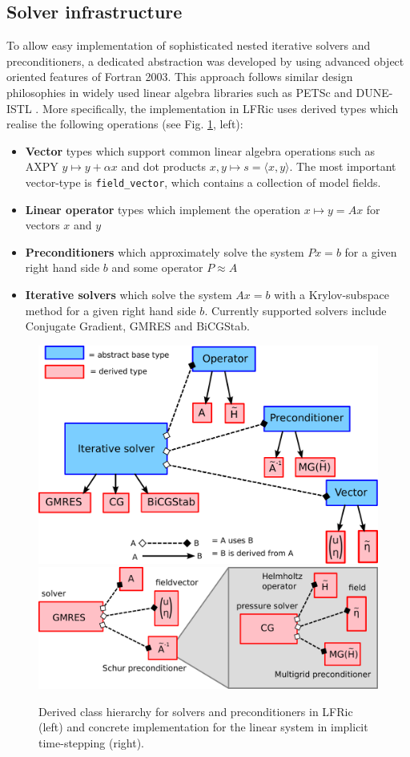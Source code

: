 \documentclass[times]{elsarticle}
\begin{document}
\subsection{Solver infrastructure}
To allow easy implementation of sophisticated nested iterative solvers
and preconditioners, a dedicated abstraction was developed by using
advanced object oriented features of Fortran 2003. This approach
follows similar design philosophies in widely used linear algebra
libraries such as PETSc \cite{Balay1997,Balay2018} and DUNE-ISTL
\cite{Blatt2007}. More specifically, the implementation in LFRic uses
derived types which realise the following operations (see
Fig. \ref{fig:class_hierarchy}, left):
\begin{itemize}
\item \textbf{Vector} types which support common linear algebra
  operations such as AXPY $y\mapsto y+\alpha x$ and dot products
  $x,y\mapsto s = \langle x,y\rangle$. The most important vector-type
  is \texttt{field\_vector}, which contains a collection of model
  fields.
\item \textbf{Linear operator} types which implement the operation $x\mapsto y=Ax$ for vectors $x$ and $y$
\item \textbf{Preconditioners} which approximately solve the system $Px=b$ for a
  given right hand side $b$ and some operator $P\approx A$
\item \textbf{Iterative solvers} which solve the system $Ax=b$ with a
  Krylov-subspace method for a given right hand side $b$. Currently
  supported solvers include Conjugate Gradient, GMRES and BiCGStab.
\end{itemize}
\begin{figure}
  \begin{center}
    \includegraphics[width=0.45\linewidth]{class_hierarchy.pdf}
    \hfill
    \includegraphics[width=0.45\linewidth]{class_concrete.pdf}
    \caption{Derived class hierarchy for solvers and preconditioners
      in LFRic (left) and concrete implementation for the linear
      system in implicit time-stepping (right).}
    \label{fig:class_hierarchy}
  \end{center}
\end{figure}
\end{document}
